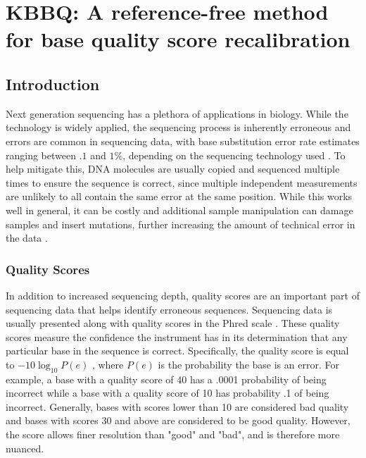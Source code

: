 \chapter{KBBQ: A reference-free method for base quality score recalibration}
\label{ch:kbbq}
\section{Introduction}

Next generation sequencing has a plethora of applications in biology. %
While the technology is widely applied, the sequencing process is inherently erroneous and errors are common in sequencing data, with base substitution error rate estimates ranging between $.1$ and $1\%$, depending on the sequencing technology used \parencite{fox_accuracy_2014}.
To help mitigate this, DNA molecules are usually copied and sequenced multiple times to ensure the sequence is correct, since multiple independent measurements are unlikely to all contain the same error at the same position. While this works well in general, it can be costly and additional sample manipulation can damage samples and insert mutations, further increasing the amount of technical error in the data \parencite{schirmer_insight_2015, ma_analysis_2019}.

\subsection{Quality Scores}

In addition to increased sequencing depth, quality scores are an important part of sequencing data that helps identify erroneous sequences. Sequencing data is usually presented along with quality scores in the Phred scale \parencite{ewing_base-calling_1998, ewing_base-calling_1998-1}.
These quality scores measure the confidence the instrument has in its determination that any particular base in the sequence is correct.
Specifically, the quality score is equal to $-10\log_{10}P(e)$ \parencite{ewing_base-calling_1998} \parencite{ewing_base-calling_1998-1}, where $P(e)$ is the probability the base is an error.
For example, a base with a quality score of 40 has a .0001 probability of being incorrect while a base with a quality score of 10 has probability .1 of being incorrect. Generally, bases with scores lower than 10 are considered bad quality and bases with scores 30 and above are considered to be good quality. However, the score allows finer resolution than "good" and "bad", and is therefore more nuanced.

